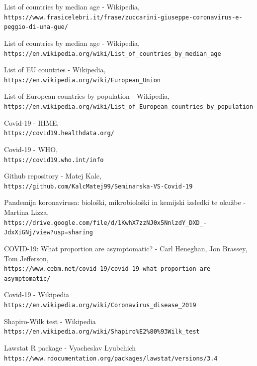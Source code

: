 \documentclass[a4paper,11pt]{article}
\begin{document}
\begin{thebibliography}{9}

List of countries by median age - Wikipedia,
\\\texttt{https://www.frasicelebri.it/frase/zuccarini-giuseppe-coronavirus-e-peggio-di-una-gue/}

List of countries by median age - Wikipedia,
\\\texttt{https://en.wikipedia.org/wiki/List\_of\_countries\_by\_median\_age}

List of EU countries - Wikipedia,
\\\texttt{https://en.wikipedia.org/wiki/European\_Union}


List of European countries by population - Wikipedia,
\\\texttt{https://en.wikipedia.org/wiki/List\_of\_European\_countries\_by\_population}


Covid-19 - IHME,
\\\texttt{https://covid19.healthdata.org/}


Covid-19 - WHO,
\\\texttt{https://covid19.who.int/info}


Github repository - Matej Kalc,
\\\texttt{https://github.com/KalcMatej99/Seminarska-VS-Covid-19}


Pandemija koronavirusa: biološki, mikrobiološki in kemijski izsledki te okužbe - Martina Lizza,
\\\texttt{https://drive.google.com/file/d/1KwhX7zzNJ0x5NnlzdY\_DXD\_-JdxXiGNj/view?usp=sharing}

COVID-19: What proportion are asymptomatic? - Carl Heneghan, Jon Brassey, Tom Jefferson,
\\\texttt{https://www.cebm.net/covid-19/covid-19-what-proportion-are-asymptomatic/}

Covid-19 - Wikipedia
\\\texttt{https://en.wikipedia.org/wiki/Coronavirus\_disease\_2019}

Shapiro-Wilk test - Wikipedia
\\\texttt{https://en.wikipedia.org/wiki/Shapiro\%E2\%80\%93Wilk\_test}

Lawstat R package - Vyacheslav Lyubchich
\\\texttt{https://www.rdocumentation.org/packages/lawstat/versions/3.4}



\end{thebibliography}
\end{document}
